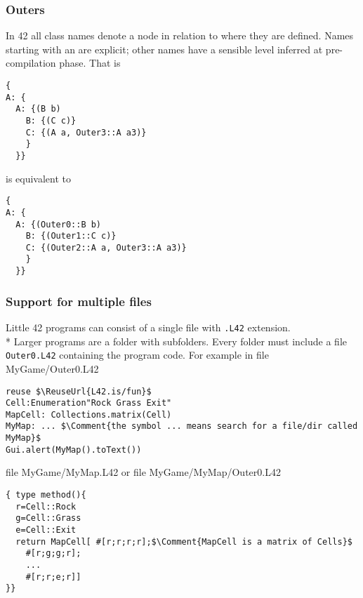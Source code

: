 \begin{frame}[fragile]
\frametitle{Outers}
In 42 all class names denote a node in relation 
to where they are defined.
Names starting with an \Q@Outer@ are explicit;
other names have a sensible \Q@Outer@ level inferred at pre-compilation phase. That is

\begin{NiceCode}{59ex}{0.8}
\begin{lstlisting}
{
A: {
  A: {(B b)
    B: {(C c)}
    C: {(A a, Outer3::A a3)}
    }
  }}
\end{lstlisting}
\end{NiceCode}

is equivalent to 

\begin{NiceCode}{59ex}{0.8}
\begin{lstlisting}
{
A: {
  A: {(Outer0::B b)
    B: {(Outer1::C c)}
    C: {(Outer2::A a, Outer3::A a3)}
    }
  }}
\end{lstlisting}
\end{NiceCode}
\end{frame}



\begin{frame}[fragile]
\frametitle{Support for multiple files}
Little 42 programs can consist of a single file with \texttt{.L42}
extension.\\*
Larger programs are a folder with subfolders.
Every folder must include a file \texttt{Outer0.L42}
containing the program code.
For example in 
file MyGame/Outer0.L42
\begin{NiceCode}{59ex}{0.8}
\begin{lstlisting}
reuse $\ReuseUrl{L42.is/fun}$
Cell:Enumeration"Rock Grass Exit"
MapCell: Collections.matrix(Cell)
MyMap: ... $\Comment{the symbol ... means search for a file/dir called MyMap}$
Gui.alert(MyMap().toText())
\end{lstlisting}
\end{NiceCode}

file MyGame/MyMap.L42 or file MyGame/MyMap/Outer0.L42
\begin{NiceCode}{59ex}{0.8}
\begin{lstlisting}
{ type method(){
  r=Cell::Rock
  g=Cell::Grass
  e=Cell::Exit
  return MapCell[ #[r;r;r;r];$\Comment{MapCell is a matrix of Cells}$
    #[r;g;g;r];
    ...
    #[r;r;e;r]]
}}
\end{lstlisting}
\end{NiceCode}
\end{frame}

